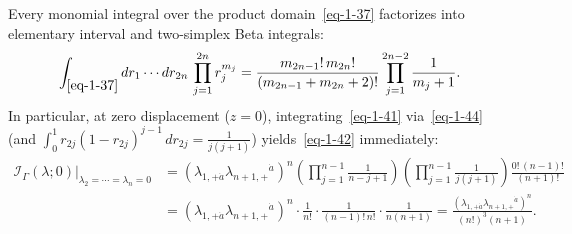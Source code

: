 \documentclass[11pt]{article}
\numberwithin{equation}{section}
\numberwithin{figure}{section}
\numberwithin{table}{section}
\begin{document}
Every monomial integral over the product domain~\eqref{eq-1-37} factorizes into elementary interval and two-simplex Beta integrals:
\begin{equation}\label{eq-1-44}
\int_{\eqref{eq-1-37}}dr_1\cdots dr_{2n}\,\prod_{j=1}^{2n}r_j^{m_j}=\frac{m_{2n-1}!\,m_{2n}!}{(m_{2n-1}+m_{2n}+2)!}\prod_{j=1}^{2n-2}\frac1{m_j+1}.
\end{equation}
In particular, at zero displacement ($z=0$), integrating~\eqref{eq-1-41} via~\eqref{eq-1-44} (and $\int_0^1 r_{2j}(1-r_{2j})^{j-1}\,dr_{2j}=\frac{1}{j(j+1)}$) yields~\eqref{eq-1-42} immediately:
\begin{equation*}
\begin{aligned}
\left.\mathcal I_\Gamma(\lambda;0)\right|_{\lambda_2=\cdots=\lambda_n=0}
&=(\lambda_{1,+\dot a}\lambda_{n+1,+}{}^{\dot a})^n
\left(\prod_{j=1}^{n-1}\frac{1}{n-j+1}\right)
\left(\prod_{j=1}^{n-1}\frac{1}{j(j+1)}\right)
\frac{0!\,(n-1)!}{(n+1)!}\\
&=(\lambda_{1,+\dot a}\lambda_{n+1,+}{}^{\dot a})^n
\cdot\frac{1}{n!}\cdot\frac{1}{(n-1)!\,n!}\cdot\frac{1}{n(n+1)}
=\frac{(\lambda_{1,+\dot a}\lambda_{n+1,+}{}^{\dot a})^n}{(n!)^3(n+1)}.
\end{aligned}
\end{equation*}
\end{document}
